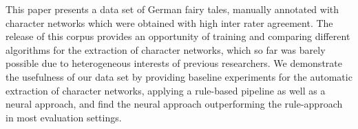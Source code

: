 This paper presents a data set of German fairy tales, manually annotated with character networks which were obtained with high inter rater agreement. The release of this corpus provides an opportunity of training and comparing different algorithms for the extraction of character networks, which so far was barely possible due to heterogeneous interests of previous researchers. We demonstrate the usefulness of our data set by providing baseline experiments for the automatic extraction of character networks, applying a rule-based pipeline as well as a neural approach, and find the neural approach outperforming the rule-approach in most evaluation settings.
